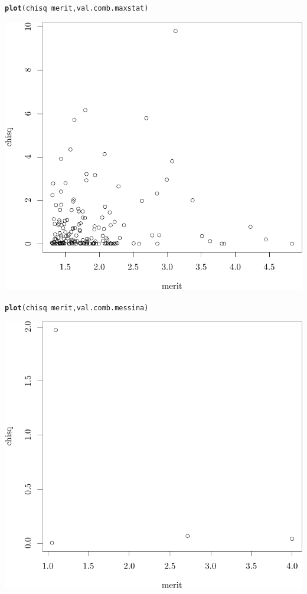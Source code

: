 \documentclass{article}\usepackage[]{graphicx}\usepackage[]{color}
\makeatletter
\def\maxwidth{ %
  \ifdim\Gin@nat@width>\linewidth
    \linewidth
  \else
    \Gin@nat@width
  \fi
}
\newcommand{\hlopt}[1]{\textcolor[rgb]{0,0,0}{#1}}%
\newcommand{\hlstd}[1]{\textcolor[rgb]{0.345,0.345,0.345}{#1}}%
\newcommand{\hlkwd}[1]{\textcolor[rgb]{0.737,0.353,0.396}{\textbf{#1}}}%
\newenvironment{kframe}{%
 \def\at@end@of@kframe{}%
 \ifinner\ifhmode%
  \def\at@end@of@kframe{\end{minipage}}%
  \begin{minipage}{\columnwidth}%
 \fi\fi%
 \def\FrameCommand##1{\hskip\@totalleftmargin \hskip-\fboxsep
 \colorbox{shadecolor}{##1}\hskip-\fboxsep
     \hskip-\linewidth \hskip-\@totalleftmargin \hskip\columnwidth}%
 \MakeFramed {\advance\hsize-\width
   \@totalleftmargin\z@ \linewidth\hsize
   \@setminipage}}%
 {\par\unskip\endMakeFramed%
 \at@end@of@kframe}
\newenvironment{knitrout}{}{} %
\makeatother
\begin{document}
\begin{knitrout}
{}


\begin{kframe}\begin{alltt}
\hlkwd{plot}\hlstd{(chisq} \hlopt{~} \hlstd{merit, val.comb.maxstat)}
\end{alltt}
\end{kframe}

{\centering \includegraphics[width=\maxwidth]{figure/07-E3-E3-val-3} 

}


\begin{kframe}\begin{alltt}
\hlkwd{plot}\hlstd{(chisq} \hlopt{~} \hlstd{merit, val.comb.messina)}
\end{alltt}
\end{kframe}

{\centering \includegraphics[width=\maxwidth]{figure/07-E3-E3-val-4} 

}



\end{knitrout}
\end{document}
